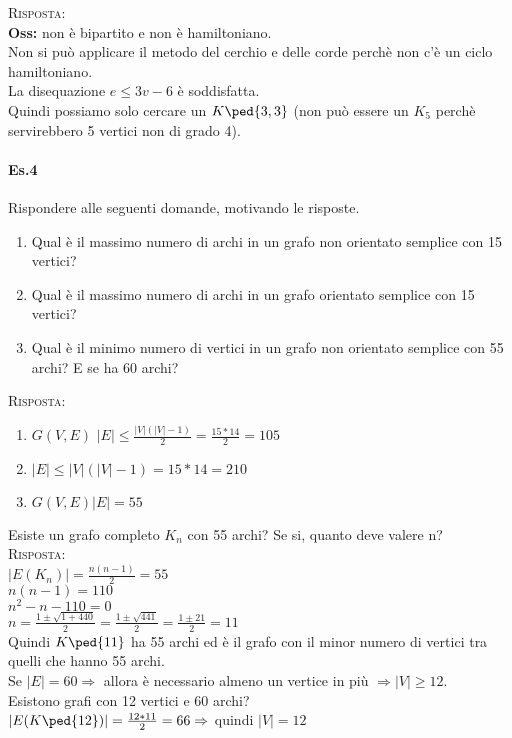 \noindent
\textsc{Risposta:} \\
\textbf{Oss:} non è bipartito e non è hamiltoniano. \\
Non si può applicare il metodo del cerchio e delle corde perchè non c'è un ciclo hamiltoniano. \\
La disequazione \(e \leq 3v -6\) è soddisfatta. \\
Quindi possiamo solo cercare un $K \ped{3,3}$ (non può essere un $K_5$ perchè servirebbero 5 vertici non di grado 4). 

\paragraph{Es.4} Rispondere alle seguenti domande, motivando le risposte.
\begin{enumerate}
    \item Qual è il massimo numero di archi in un grafo non orientato semplice con 15 vertici?
    \item Qual è il massimo numero di archi in un grafo orientato semplice con 15 vertici?
    \item Qual è il minimo numero di vertici in un grafo non orientato semplice con 55 archi? E se ha 60 archi?
\end{enumerate}
\textsc{Risposta:}
\begin{enumerate}
    \item \( G(V,E)\)  \(|E| \leq \frac{|V|(|V|-1)}{2} = \frac{15*14}{2} =105 \)
    \item \(|E| \leq |V|(|V|-1) = 15*14=210\)
    \item \( G(V,E) |E|=55\) 
\end{enumerate}
Esiste un grafo completo $K_n$ con 55 archi? Se si, quanto deve valere n?\\

\noindent
\textsc{Risposta:} \\
\(|E(K_n)| = \frac{n(n-1)}{2}= 55\) \\
\(n(n-1)= 110\) \\
\(n^2 - n- 110=0\) \\
\(n= \frac{1 \pm \sqrt{1+440}}{2}= \frac{1 \pm \sqrt{441}}{2} = \frac{1 \pm 21}{2}=11 \) \\
Quindi $K\ped{11}$ ha 55 archi ed è il grafo con il minor numero di vertici tra quelli che hanno 55 archi. \\
Se \(|E|=60 \Rightarrow \) allora è necessario almeno un vertice in più \(\Rightarrow |V| \geq 12\). \\
Esistono grafi con 12 vertici e 60 archi? \\
\(|E(K\ped{12})| = \frac{12*11}{2}= 66 \Rightarrow\) quindi \(|V|= 12\)

